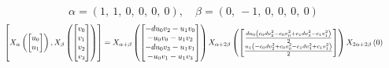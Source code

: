 \documentclass[11pt]{article}
\theoremstyle{definition}
\begin{document}
\[
\alpha = \left( 1, \  1, \  0, \  0, \  0, \  0\right), \quad \beta = \left( 0, \  -1, \  0, \  0, \  0, \  0\right)
\]
\[
\scaletoalign{\textwidth}{\left[ X_{\alpha}\left(\left[\begin{matrix}u_{0}\\u_{1}\end{matrix}\right]\right), X_{\beta}\left(\left[\begin{matrix}v_{0}\\v_{1}\\v_{2}\\v_{3}\end{matrix}\right]\right) \right] = X_{\alpha + \beta}\left(\left[\begin{matrix}- d u_{0} v_{2} - u_{1} v_{0}\\- u_{0} v_{0} - u_{1} v_{2}\\- d u_{0} v_{3} - u_{1} v_{1}\\- u_{0} v_{1} - u_{1} v_{3}\end{matrix}\right]\right) X_{\alpha + 2\beta}\left(\left[\begin{matrix}\frac{d u_{0} \left(c_{0} d v_{2}^{2} - c_{0} v_{0}^{2} + c_{1} d v_{3}^{2} - c_{1} v_{1}^{2}\right)}{2}\\\frac{u_{1} \left(- c_{0} d v_{2}^{2} + c_{0} v_{0}^{2} - c_{1} d v_{3}^{2} + c_{1} v_{1}^{2}\right)}{2}\end{matrix}\right]\right) X_{2\alpha + 2\beta}\left(0\right)}
\]
\end{document}
